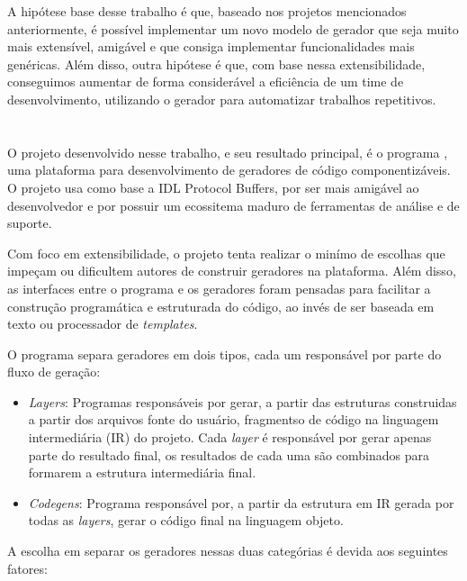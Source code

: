 A hipótese base desse trabalho é que, baseado nos projetos mencionados anteriormente,
é possível implementar um novo modelo de gerador que seja muito mais extensível, amigável
e que consiga implementar funcionalidades mais genéricas. Além disso, outra hipótese
é que, com base nessa extensibilidade, conseguimos aumentar de forma considerável a
eficiência de um time de desenvolvimento, utilizando o gerador para automatizar
trabalhos repetitivos.

\section{\Baker{}}

O projeto desenvolvido nesse trabalho, e seu resultado principal, é o programa \Baker{},
uma plataforma para desenvolvimento de geradores de código componentizáveis. O projeto usa
como base a IDL Protocol Buffers, por ser mais amigável ao desenvolvedor e por possuir um
ecossitema maduro de ferramentas de análise e de suporte.

Com foco em extensibilidade, o projeto tenta realizar o minímo de escolhas que impeçam ou
dificultem autores de construir geradores na plataforma. Além disso, as interfaces entre o
programa e os geradores foram pensadas para facilitar a construção programática e estruturada
do código, ao invés de ser baseada em texto ou processador de \textit{templates}.

O programa separa geradores em dois tipos, cada um responsável por parte do fluxo de geração:

\begin{itemize}
\item \textit{Layers}: Programas responsáveis por gerar, a partir das estruturas construidas
  a partir dos arquivos fonte do usuário, fragmentso de código na linguagem intermediária (IR)
  do projeto. Cada \textit{layer} é responsável por gerar apenas parte do resultado final, os
  resultados de cada uma são combinados para formarem a estrutura intermediária final.
\item \textit{Codegens}: Programa responsável por, a partir da estrutura em IR gerada por todas
  as \textit{layers}, gerar o código final na linguagem objeto.
\end{itemize}

A escolha em separar os geradores nessas duas categórias é devida aos seguintes fatores:

